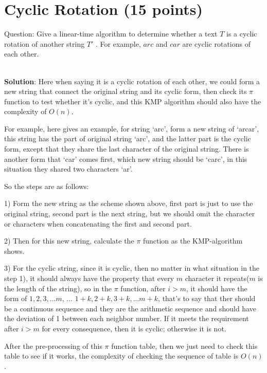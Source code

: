 \documentclass{article}
\begin{document}
\section{Cyclic Rotation (15 points)}
Question: Give a linear-time algorithm to determine whether a text $T$ is a cyclic rotation of another string $T'$ . For example, $arc$ and $car$ are cyclic rotations of each other.

~\\
\textbf{Solution}:\newline
\indent Here when saying it is a cyclic rotation of each other, we could form a new string that connect the original string and its cyclic form, then check its $\pi$ function to test whether it's cyclic, and this KMP algorithm should also have the complexity of $O(n)$.

For example, here gives an example, for string `arc', form a new string of `arcar', this string has the part of original string `arc', and the latter part is the cyclic form, except that they share the last character of the original string. There is another form that `car' comes first, which new string should be `carc', in this situation they shared two characters `ar'.

So the steps are as follows:

1) Form the new string as the scheme shown above, first part is just to use the original string, second part is the next string, but we should omit the character or characters when concatenating the first and second part.

2) Then for this new string, calculate the $\pi$ function as the KMP-algorithm shows.

3) For the cyclic string, since it is cyclic, then no matter in what situation in the step 1), it should always have the property that every $m$ character it repeats($m$ is the length of the string), so in the $\pi$ function, after $i > m$, it should have the form of $1, 2, 3, ... m$, ... $1+k, 2+k, 3+k, ... m+k$, that's to say that ther should be a continuous sequence and they are the arithmetic sequence and should have the deviation of 1 between each neighbor number. If it meets the requirement after $i > m$ for every consequence, then it is cyclic; otherwise it is not.

After the pre-processing of this $\pi$ function table, then we just need to check this table to see if it works, the complexity of checking the sequence of table is $O(n)$.
\end{document}
